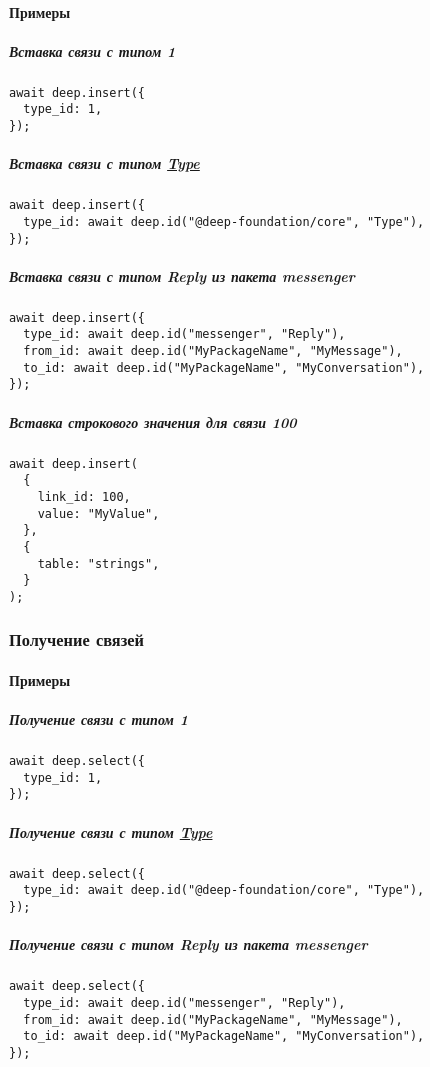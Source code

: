 \documentclass{article}
\begin{document}
\paragraph{Примеры}

\subparagraph{Вставка связи с типом 1}
\begin{lstlisting}
await deep.insert({
  type_id: 1,
});
\end{lstlisting}

\subparagraph{Вставка связи с типом \hyperlink{type.Def}{Type}}
\begin{lstlisting}
await deep.insert({
  type_id: await deep.id("@deep-foundation/core", "Type"),
});
\end{lstlisting}

\subparagraph{Вставка связи с типом Reply из пакета messenger}
\begin{lstlisting}
await deep.insert({
  type_id: await deep.id("messenger", "Reply"),
  from_id: await deep.id("MyPackageName", "MyMessage"),
  to_id: await deep.id("MyPackageName", "MyConversation"),
});
\end{lstlisting}

\subparagraph{Вставка строкового значения для связи 100}
\begin{lstlisting}
await deep.insert(
  {
    link_id: 100,
    value: "MyValue",
  },
  {
    table: "strings",
  }
);
\end{lstlisting}

\subsubsection{Получение связей}

\paragraph{Примеры}

\subparagraph{Получение связи с типом 1}
\begin{lstlisting}
await deep.select({
  type_id: 1,
});
\end{lstlisting}

\subparagraph{Получение связи с типом \hyperlink{type.Def}{Type}}
\begin{lstlisting}
await deep.select({
  type_id: await deep.id("@deep-foundation/core", "Type"),
});
\end{lstlisting}

\subparagraph{Получение связи с типом Reply из пакета messenger}
\begin{lstlisting}
await deep.select({
  type_id: await deep.id("messenger", "Reply"),
  from_id: await deep.id("MyPackageName", "MyMessage"),
  to_id: await deep.id("MyPackageName", "MyConversation"),
});
\end{lstlisting}
\end{document}
